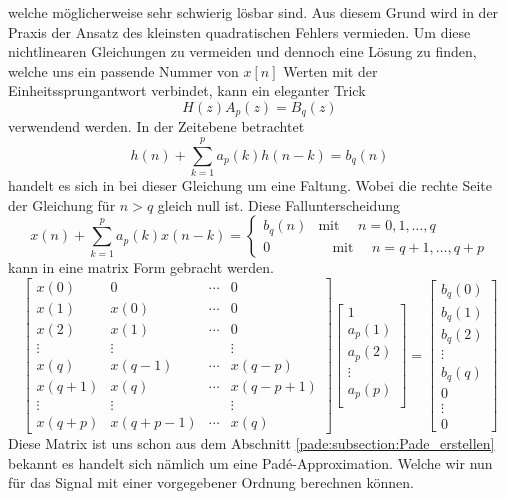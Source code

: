 welche möglicherweise sehr schwierig lösbar sind.
Aus diesem Grund wird in der Praxis der Ansatz des kleinsten quadratischen Fehlers vermieden. 
Um diese nichtlinearen Gleichungen zu vermeiden und dennoch eine Lösung zu finden, welche uns ein passende Nummer von $x[n]$ Werten mit der Einheitssprungantwort verbindet, kann ein eleganter Trick 
\begin{equation}
H(z) A_{p}(z)=B_{q}(z)
\end{equation}
verwendend werden. 
In der Zeitebene betrachtet
\begin{equation}
h(n)+\sum_{k=1}^{p} a_{p}(k) h(n-k)=b_{q}(n)
\end{equation}
handelt es sich in bei dieser Gleichung um eine Faltung.
Wobei die rechte Seite der Gleichung für $n>q$ gleich null ist.
Diese Fallunterscheidung
\begin{equation}
x(n)+\sum_{k=1}^{p} a_{p}(k) x(n-k)
=
\left\{\begin{array}{cc}
b_{q}(n) & 
\text{mit } \quad n=0,1, \ldots, q \\
0 & 
\quad\text{mit } \quad n=q+1, \ldots, q+p
\end{array}\right.\end{equation}
kann in eine matrix Form gebracht werden.
\begin{equation}
\left[\begin{array}{cccc}
x(0) & 0 & \cdots & 0 \\
x(1) & x(0) & \cdots & 0 \\
x(2) & x(1) & \cdots & 0 \\
\vdots & \vdots & & \vdots \\
x(q) & x(q-1) & \cdots & x(q-p) \\
x(q+1) & x(q) & \cdots & x(q-p+1) \\
\vdots & \vdots & & \vdots \\
x(q+p) & x(q+p-1) & \cdots & x(q)
\end{array}\right]
\left[\begin{array}{c}
1 \\
a_{p}(1) \\
a_{p}(2) \\
\vdots \\
a_{p}(p) \\
\end{array}\right]
=
\left[\begin{array}{c}
b_{q}(0) \\
b_{q}(1) \\
b_{q}(2) \\
\vdots \\
b_{q}(q) \\
0 \\
\vdots \\
0
\end{array}\right]
\end{equation}
Diese Matrix ist uns schon aus dem Abschnitt \ref{pade:subsection:Pade_erstellen} bekannt es handelt sich nämlich um eine Padé-Approximation.
Welche wir nun für das Signal mit einer vorgegebener Ordnung berechnen können.

